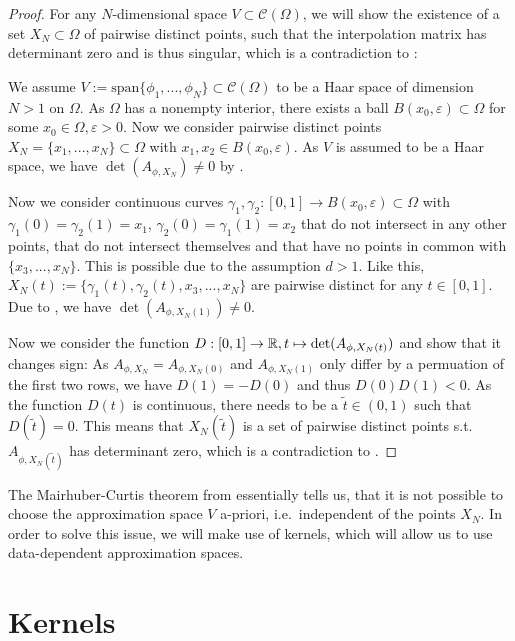 \begin{proof}
For any $N$-dimensional space $V \subset \mathcal{C}(\Omega)$, we will show the existence of a set $X_N \subset \Omega$ of pairwise distinct points, 
such that the interpolation matrix has determinant zero and is thus singular, 
which is a contradiction to :

We assume $V:= \mathrm{span} \{ \phi_1, ..., \phi_N \} \subset \mathcal{C}(\Omega)$ to be a Haar space of dimension $N > 1$ on $\Omega$.
As $\Omega$ has a nonempty interior, there exists a ball $B(x_0, \varepsilon) \subset \Omega$ for some $x_0 \in \Omega, \varepsilon > 0$.
Now we consider pairwise distinct points $X_N = \{ x_1, ..., x_N \} \subset \Omega$ with $x_1, x_2 \in B(x_0, \varepsilon)$.
As $V$ is assumed to be a Haar space, we have $\det(A_{\phi, X_N}) \neq 0$ by . 

Now we consider continuous curves $\gamma_1, \gamma_2: [0, 1] \rightarrow B(x_0, \varepsilon) \subset \Omega$ with $\gamma_1(0) = \gamma_2(1) = x_1$, $\gamma_2(0) = \gamma_1(1) = x_2$ that do not intersect in any other points, 
that do not intersect themselves and that have no points in common with $\{x_3, ..., x_N\}$.
This is possible due to the assumption $d>1$.
Like this, $X_N(t) := \{ \gamma_1(t), \gamma_2(t), x_3, ..., x_N \}$ are pairwise distinct for any $t \in [0, 1]$.
Due to , we have $\det(A_{\phi, X_N(1)}) \neq 0$.

Now we consider the function $D: [0, 1] \rightarrow \mathbb{R}, t \mapsto \det(A_{\phi, X_N(t)})$ and show that it changes sign:
As $A_{\phi, X_N} = A_{\phi, X_N(0)}$ and $A_{\phi, X_N(1)}$ only differ by a permuation of the first two rows, 
we have $D(1) = -D(0)$ and thus $D(0) D(1) < 0$.
As the function $D(t)$ is continuous, there needs to be a $\tilde{t} \in (0, 1)$ such that $D(\tilde{t}) = 0$.
This means that $X_N(\tilde{t})$ is a set of pairwise distinct points s.t.\ $A_{\phi, X_N(\tilde{t})}$ has determinant zero, which is a contradiction to .
\end{proof}


The Mairhuber-Curtis theorem from  essentially tells us, 
that it is not possible to choose the approximation space $V$ a-priori, i.e.\ independent of the points $X_N$. 
In order to solve this issue, we will make use of kernels, which will allow us to use data-dependent approximation spaces.



\section{Kernels}

